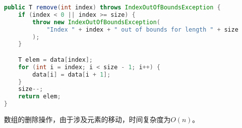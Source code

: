 
\begin{lstlisting}[language=Java]
public T remove(int index) throws IndexOutOfBoundsException {
    if (index < 0 || index >= size) {
        throw new IndexOutOfBoundsException(
            "Index " + index + " out of bounds for length " + size
        );
    }

    T elem = data[index];
    for (int i = index; i < size - 1; i++) {
        data[i] = data[i + 1];
    }
    size--;
    return elem;
}
\end{lstlisting}

数组的删除操作，由于涉及元素的移动，时间复杂度为$ O(n) $。\\

\newpage